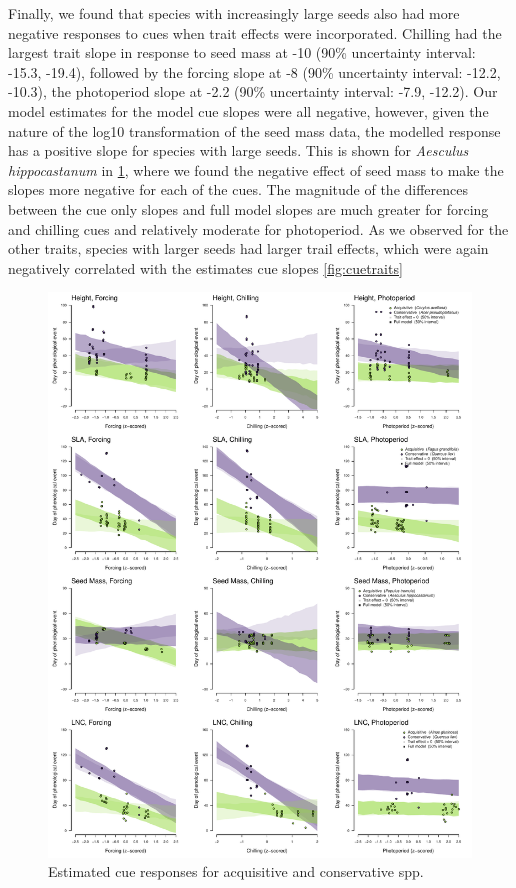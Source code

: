 \documentclass{article}\usepackage[]{graphicx}\usepackage[]{color}
\begin{document}
Finally, we found that species with increasingly large seeds also had more negative responses to cues when trait effects were incorporated. Chilling had the largest trait slope in response to seed mass at -10 (90\% uncertainty interval: -15.3, -19.4), followed by the forcing slope at -8 (90\% uncertainty interval: -12.2, -10.3), the photoperiod slope at -2.2 (90\% uncertainty interval: -7.9, -12.2). Our model estimates for the model cue slopes were all negative, however, given the nature of the log10 transformation of the seed mass data, the modelled response has a positive slope for species with large seeds. This is shown for \textit{Aesculus hippocastanum} in \ref{fig:slopes}, where we found the negative effect of seed mass to make the slopes more negative for each of the cues. The magnitude of the differences between the cue only slopes and full model slopes are much greater for forcing and chilling cues and relatively moderate for photoperiod. As we observed for the other traits, species with larger seeds had larger trail effects, which were again negatively correlated with the estimates cue slopes \ref{fig:cuetraits}


\begin{figure}[h!]
    \centering
 \includegraphics[width=\textwidth]{..//..//analyses/traits/figures/slopesConsAcqu.pdf} 
    \caption{Estimated cue responses for acquisitive and conservative spp.}
    \label{fig:slopes}
\end{figure}
\end{document}
